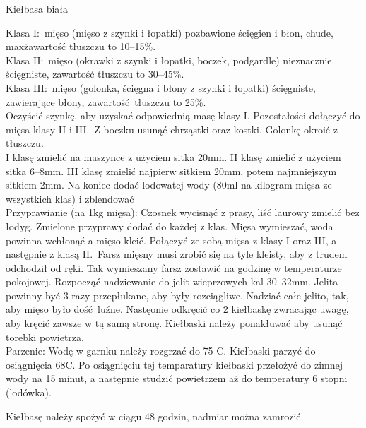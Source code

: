 \documentclass[a4paper,12pt]{article}
\begin{document}
\begin{recipe}{Kiełbasa biała}{}{}


\freeform%
Klasa I:\ mięso  (mięso z szynki i łopatki) pozbawione ścięgien i błon, chude, max\. zawartość tłuszczu to 10--15\%. \\
Klasa II:\ mięso (okrawki z szynki i łopatki, boczek, podgardle) nieznacznie ścięgniste, zawartość tłuszczu to 30--45\%. \\
Klasa III:\ mięso (golonka, ścięgna i błony z szynki i łopatki) ścięgniste, zawierające błony, zawartość tłuszczu to 25\%.\\

Oczyścić szynkę, aby uzyskać odpowiednią masę klasy I. Pozostałości dołączyć do mięsa klasy II i III.\
Z boczku usunąć chrząstki oraz kostki. Golonkę okroić z tłuszczu.\\
I klasę zmielić na maszynce z użyciem sitka 20mm. 
II klasę zmielić z użyciem sitka 6--8mm.
III klasę zmielić najpierw sitkiem 20mm, potem najmniejszym sitkiem 2mm. Na koniec dodać lodowatej wody (80ml na kilogram mięsa ze wszystkich klas) i zblendować \\

Przyprawianie (na 1kg mięsa):
Czosnek wycisnąć z prasy, liść laurowy zmielić bez łodyg. Zmielone przyprawy dodać do każdej z klas.
Mięsa wymieszać, woda powinna wchłonąć a mięso kleić.
Połączyć ze sobą mięsa z klasy I oraz III, a następnie z klasą II.\
Farsz mięsny musi zrobić się na tyle kleisty, aby z trudem odchodził od ręki. Tak wymieszany farsz
zostawić na godzinę w temperaturze pokojowej.
\freeform%
Rozpocząć nadziewanie do jelit wieprzowych kal 30--32mm.
Jelita powinny być 3 razy przepłukane, aby były rozciągliwe. Nadziać całe jelito, tak, aby mięso było dość luźne.
Nastęonie odkręcić co 2 kiełbaskę zwracając uwagę, aby kręcić zawsze w tą samą stronę.
Kiełbaski należy ponakłuwać aby usunąć torebki powietrza. \\

Parzenie:
Wodę w garnku należy rozgrzać do 75 \0C. Kiełbaski parzyć do osiągnięcia 68\0C. 
Po osiągnięciu tej temparatury kiełbaski przełożyć do zimnej wody na 15 minut, a następnie studzić powietrzem aż do temperatury 6 stopni (lodówka).

Kiełbasę należy spożyć w ciągu 48 godzin, nadmiar można zamrozić.

\end{recipe}
\end{document}

